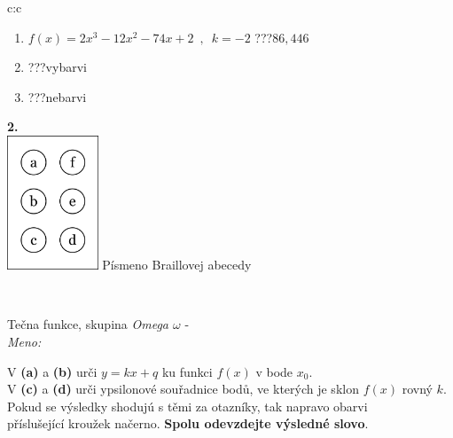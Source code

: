 \documentclass[10pt]{report}
\begin{document}
\begin{tabular}{c:c}
\begin{minipage}[c][104.5mm][t]{0.5\linewidth}
\begin{center}
\begin{minipage}{0.79\linewidth}
\begin{center}
\begin{varwidth}{\linewidth}
\begin{enumerate}
\item $f(x)=2x^3-12x^2-74x+2\enspace , \enspace k=-2$\quad \dotfill\; ???\;\dotfill \quad $86 , 446$
\item \quad \dotfill\; ???\;\dotfill \quad vybarvi
\item \quad \dotfill\; ???\;\dotfill \quad nebarvi
\end{enumerate}
\end{varwidth}
\end{center}
\end{minipage}
\begin{minipage}{0.20\linewidth}
\begin{center}
{\Huge\bfseries 2.} \\[2mm]
\includegraphics[height=40mm]{../images/braille.png}
{\small Písmeno Braillovej abecedy}
\end{center}
\end{minipage}
\end{center}
\end{minipage}
\\ \hdashline
\begin{minipage}[c][104.5mm][t]{0.5\linewidth}
\begin{center}
\vspace{7mm}
{\huge Tečna funkce, skupina \textit{Omega $\omega$} -}\\[5mm]
\textit{Meno:}\phantom{xxxxxxxxxxxxxxxxxxxxxxxxxxxxxxxxxxxxxxxxxxxxxxxxxxxxxxxxxxxxxxxxx}\\[5mm]
\begin{minipage}{0.95\linewidth}
\begin{center}
V \textbf{(a)} a \textbf{(b)} urči  $y = kx + q$ ku funkci $f(x)$ v bode $x_0$.\\V \textbf{(c)} a \textbf{(d)} urči ypsilonové souřadnice bodů, ve kterých je sklon $f(x)$ rovný $k$.\\Pokud se výsledky shodujú s těmi za otazníky, tak napravo obarvi\\příslušející kroužek načerno. \textbf{Spolu odevzdejte výsledné slovo}.
\end{center}

\end{minipage}
\end{center}
\end{minipage}
\end{tabular}
\end{document}
